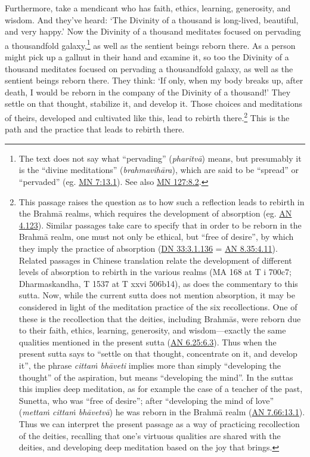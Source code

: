 \documentclass[12pt,openany]{book}%
\begin{document}
Furthermore, take a mendicant who has faith, ethics, learning, generosity, and wisdom. And they’ve heard: ‘The Divinity of a thousand is long-lived, beautiful, and very happy.’ Now the Divinity of a thousand meditates focused on pervading a thousandfold galaxy,\footnote{The text does not say what “pervading” (\textit{\textsanskrit{pharitvā}}) means, but presumably it is the “divine meditations” (\textit{\textsanskrit{brahmavihāra}}), which are said to be “spread” or “pervaded” (eg. \href{https://suttacentral.net/mn7/en/sujato\#13.1}{MN 7:13.1}). See also \href{https://suttacentral.net/mn127/en/sujato\#8.2}{MN 127:8.2}. } as well as the sentient beings reborn there. As a person might pick up a gallnut in their hand and examine it, so too the Divinity of a thousand meditates focused on pervading a thousandfold galaxy, as well as the sentient beings reborn there. They think: ‘If only, when my body breaks up, after death, I would be reborn in the company of the Divinity of a thousand!’ They settle on that thought, stabilize it, and develop it. Those choices and meditations of theirs, developed and cultivated like this, lead to rebirth there.\footnote{This passage raises the question as to how such a reflection leads to rebirth in the \textsanskrit{Brahmā} realms, which requires the development of absorption (eg. \href{https://suttacentral.net/an4.123/en/sujato}{AN 4.123}). Similar passages take care to specify that in order to be reborn in the \textsanskrit{Brahmā} realm, one must not only be ethical, but “free of desire”, by which they imply the practice of absorption (\href{https://suttacentral.net/dn33/en/sujato\#3.1.136}{DN 33:3.1.136} = \href{https://suttacentral.net/an8.35/en/sujato\#4.11}{AN 8.35:4.11}). Related passages in Chinese translation relate the development of different levels of absorption to rebirth in the various realms (MA 168 at T i 700c7; Dharmaskandha, T 1537 at T xxvi 506b14), as does the commentary to this sutta. Now, while the current sutta does not mention absorption, it may be considered in light of the meditation practice of the six recollections. One of these is the recollection that the deities, including \textsanskrit{Brahmās}, were reborn due to their faith, ethics, learning, generosity, and wisdom—exactly the same qualities mentioned in the present sutta (\href{https://suttacentral.net/an6.25/en/sujato\#6.3}{AN 6.25:6.3}). Thus when the present sutta says to “settle on that thought, concentrate on it, and develop it”, the phrase \textit{\textsanskrit{cittaṁ} \textsanskrit{bhāveti}} implies more than simply “developing the thought” of the aspiration, but means “developing the mind”. In the suttas this implies deep meditation, as for example the case of a teacher of the past, Sunetta, who was “free of desire”; after “developing the mind of love” (\textit{\textsanskrit{mettaṁ} \textsanskrit{cittaṁ} \textsanskrit{bhāvetvā}}) he was reborn in the \textsanskrit{Brahmā} realm (\href{https://suttacentral.net/an7.66/en/sujato\#13.1}{AN 7.66:13.1}). Thus we can interpret the present passage as a way of practicing recollection of the deities, recalling that one’s virtuous qualities are shared with the deities, and developing deep meditation based on the joy that brings. } This is the path and the practice that leads to rebirth there. 
\end{document}

